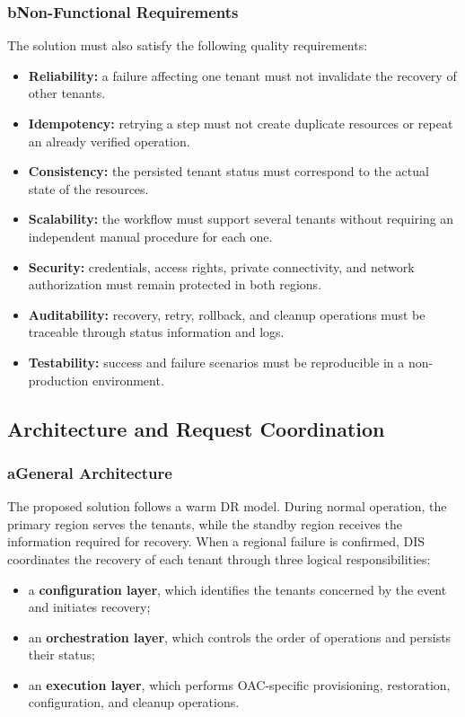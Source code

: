 \subsubsection*{b\quad Non-Functional Requirements}

The solution must also satisfy the following quality requirements:

\begin{itemize}
    \item \textbf{Reliability:} a failure affecting one tenant must not invalidate the recovery of other tenants.
    \item \textbf{Idempotency:} retrying a step must not create duplicate resources or repeat an already verified operation.
    \item \textbf{Consistency:} the persisted tenant status must correspond to the actual state of the resources.
    \item \textbf{Scalability:} the workflow must support several tenants without requiring an independent manual procedure for each one.
    \item \textbf{Security:} credentials, access rights, private connectivity, and network authorization must remain protected in both regions.
    \item \textbf{Auditability:} recovery, retry, rollback, and cleanup operations must be traceable through status information and logs.
    \item \textbf{Testability:} success and failure scenarios must be reproducible in a non-production environment.
\end{itemize}

\subsection{Architecture and Request Coordination}

\subsubsection*{a\quad General Architecture}

The proposed solution follows a warm DR model. During normal operation, the primary region serves the tenants, while the standby region receives the information required for recovery. When a regional failure is confirmed, DIS coordinates the recovery of each tenant through three logical responsibilities:

\begin{itemize}
    \item a \textbf{configuration layer}, which identifies the tenants concerned by the event and initiates recovery;
    \item an \textbf{orchestration layer}, which controls the order of operations and persists their status;
    \item an \textbf{execution layer}, which performs OAC-specific provisioning, restoration, configuration, and cleanup operations.
\end{itemize}

